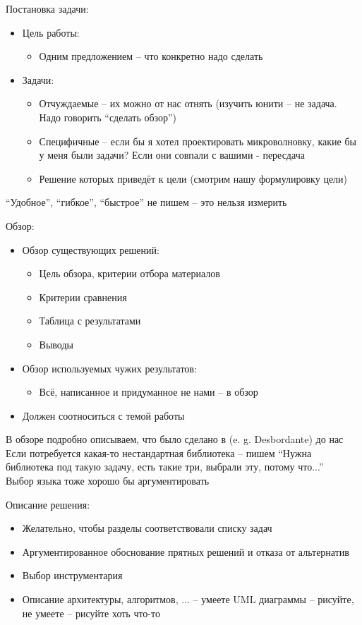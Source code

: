 Постановка задачи:
\begin{itemize}
	\item Цель работы:
	\begin{itemize}
		\item Одним предложением -- что конкретно надо сделать
	\end{itemize}
	\item Задачи:
	\begin{itemize}
		\item Отчуждаемые -- их можно от нас отнять (изучить юнити -- не задача. Надо говорить ``сделать обзор'')
		\item Специфичные -- если бы я хотел проектировать микроволновку, какие бы у меня были задачи? Если они совпали с вашими - пересдача
		\item Решение которых приведёт к цели (смотрим нашу формулировку цели)
	\end{itemize}
\end{itemize}

``Удобное'', ``гибкое'', ``быстрое'' не пишем -- это нельзя измерить

Обзор:
\begin{itemize}
	\item Обзор существующих решений:
	\begin{itemize}
		\item Цель обзора, критерии отбора материалов
		\item Критерии сравнения
		\item Таблица с результатами
		\item Выводы
	\end{itemize}
	\item Обзор используемых чужих результатов:
	\begin{itemize}
		\item Всё, написанное и придуманное не нами -- в обзор
	\end{itemize}
	\item Должен соотноситься с темой работы
\end{itemize}

В обзоре подробно описываем, что было сделано в (e. g. Desbordante) до нас \\
Если потребуется какая-то нестандартная библиотека -- пишем ``Нужна библиотека под такую задачу, есть такие три, выбрали эту, потому что...'' \\
Выбор языка тоже хорошо бы аргументировать

Описание решения:
\begin{itemize}
	\item Желательно, чтобы разделы соответствовали списку задач
	\item Аргументированное обоснование прятных решений и отказа от альтернатив
	\item Выбор инструментария
	\item Описание архитектуры, алгоритмов, ... -- умеете UML диаграммы -- рисуйте, не умеете -- рисуйте хоть что-то
\end{itemize}

